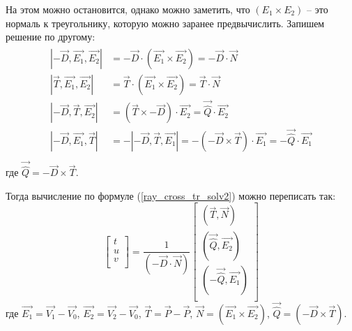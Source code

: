 \documentclass[12pt, a4paper, utf8]{article}
\begin{document}
На этом можно остановится, однако можно заметить, что $ (E_1 \times E_2) $ -- это нормаль к треугольнику, которую можно заранее предвычислить. 
Запишем решение по другому:
\begin{eqnarray*}
\begin{split}
| -\vec{D}, \vec{E_1}, \vec{E_2} | & = -\vec{D} \cdot (\vec{E_1} \times \vec{E_2}) = -\vec{D} \cdot \vec{N}\\
| \vec{T}, \vec{E_1}, \vec{E_2} | & = \vec{T} \cdot (\vec{E_1} \times \vec{E_2}) = \vec{T} \cdot \vec{N}\\
| -\vec{D}, \vec{T}, \vec{E_2} | & = (\vec{T} \times -\vec{D}) \cdot \vec{E_2} = \vec{\hat{Q}} \cdot \vec{E_2}\\
| -\vec{D}, \vec{E_1}, \vec{T} | & = - | - \vec{D}, \vec{T}, \vec{E_1} | = -(-\vec{D} \times \vec{T} ) \cdot \vec{E_1} = - \vec{\hat{Q}} \cdot \vec{E_1}\\
\end{split}
\end{eqnarray*}
где 
$\vec{\hat{Q}} = -\vec{D} \times \vec{T}$.

Тогда вычисление по формуле (\ref{ray_cross_tr_solv2}) можно переписать так:
\begin{equation*}
\left[  
\begin{array}{c} t \\ u \\ v \\ \end{array}
\right] = 
\frac{1}{(-\vec{D} \cdot \vec{N})} 
\left[  
	\begin{array}{c}
	(\vec{T}, \vec{N}) \\
	(\vec{\hat{Q}}, \vec{E_2}) \\	
	(-\vec{\hat{Q}}, \vec{E_1}) \\	
	\end{array}
\right]
\end{equation*}
где 
$\vec{E_1} = \vec{V_1} - \vec{V_0}$,
$\vec{E_2} = \vec{V_2} - \vec{V_0}$,
$\vec{T}   = \vec{P} - \vec{P}$,
$\vec{N} = (\vec{E_1} \times \vec{E_2})$,
$\vec{\hat{Q}} = (-\vec{D} \times \vec{T})$.
\end{document}

